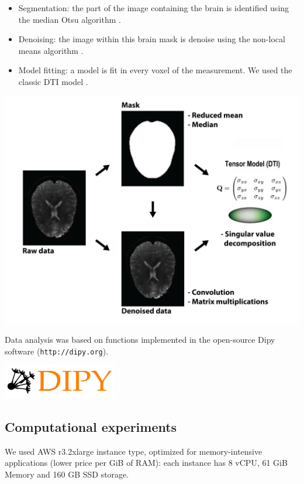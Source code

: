\documentclass[a0,landscape]{a0poster}
\begin{document}
\begin{multicols}{3}
\begin{itemize}
  \item Segmentation: the part of the image containing the brain is identified using the median Otsu algorithm \cite{Otsu1975-qg}.

  \item Denoising: the image within this brain mask is denoise using the non-local means algorithm \cite{Coupe2008-bx}.

 \item Model fitting: a model is fit in every voxel of the measurement. We used the classic DTI model \cite{Basser1994-hg}.

\end{itemize}

\includegraphics[width=25cm]{pipeline.png}

\begin{minipage}[b]{0.75\linewidth}
  Data analysis was based on functions implemented in the open-source Dipy
  software (\texttt{http://dipy.org}).
\end{minipage}
\begin{minipage}[b]{0.25\linewidth}
  \includegraphics[width=5cm]{dipy-logo.png}
\end{minipage}

\subsection*{Computational experiments}
We used AWS r3.2xlarge instance type, optimized for memory-intensive applications (lower price per GiB of RAM): each instance has 8 vCPU, 61 GiB Memory and 160 GB SSD storage.


\end{multicols}
\end{document}
